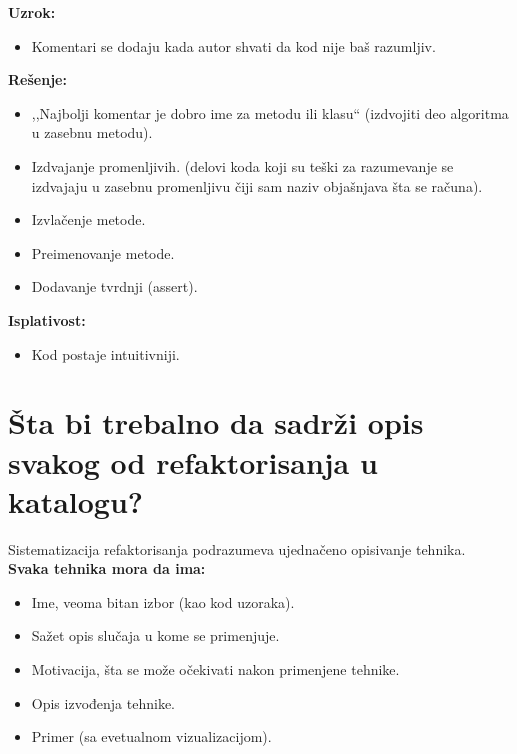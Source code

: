 \documentclass[a4paper]{article}
\begin{document}
  \noindent \textbf{Uzrok:} 
  \begin{itemize}
    \item Komentari se dodaju kada autor shvati da kod nije baš razumljiv.
  \end{itemize}

  \noindent \textbf{Rešenje:} 
  \begin{itemize}
    \item ,,Najbolji komentar je dobro ime za metodu ili klasu`` (izdvojiti deo algoritma
          u zasebnu metodu).
    \item Izdvajanje promenljivih. (delovi koda koji su teški za razumevanje se izdvajaju
          u zasebnu promenljivu čiji sam naziv objašnjava šta se računa).
    \item Izvlačenje metode.
    \item Preimenovanje metode.
    \item Dodavanje tvrdnji (assert).
  \end{itemize}

  \noindent \textbf{Isplativost:} 
  \begin{itemize}
    \item Kod postaje intuitivniji.
  \end{itemize}  
  
\section{Šta bi trebalno da sadrži opis svakog od refaktorisanja u katalogu?}
  Sistematizacija refaktorisanja podrazumeva ujednačeno opisivanje tehnika.\\
  \textbf{Svaka tehnika mora da ima:}
  \begin{itemize}
    \item Ime, veoma bitan izbor (kao kod uzoraka).
    \item Sažet opis slučaja u kome se primenjuje.
    \item Motivacija, šta se može očekivati nakon primenjene tehnike.
    \item Opis izvođenja tehnike.
    \item Primer (sa evetualnom vizualizacijom).
  \end{itemize}  
\end{document}
